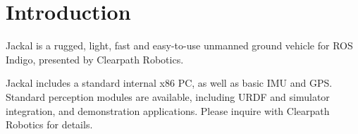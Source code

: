 \documentclass[]{clearpath-user-manual}
\begin{document}
\thispagestyle{empty}

\tableofcontents

\section{Introduction}

Jackal is a rugged, light, fast and easy-to-use unmanned ground vehicle for ROS Indigo, presented
by Clearpath Robotics.

Jackal includes a standard internal x86 PC, as well as basic IMU and GPS. Standard perception
modules are available, including URDF and simulator integration, and demonstration applications.
Please inquire with Clearpath Robotics for details.
\end{document}
